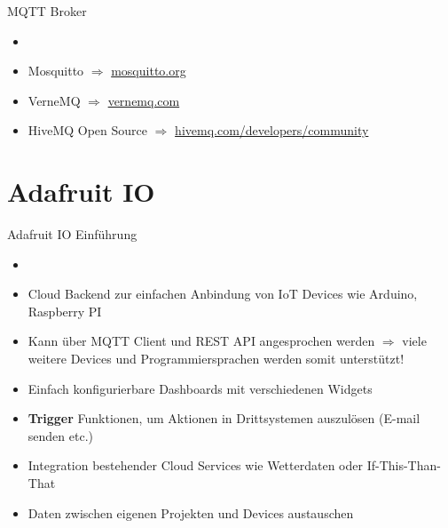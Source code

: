 \begin{frame}{MQTT Broker}
          \begin{itemize}
        \setlength{\itemindent}{1.45in}
        \item [\textbf{Broker für die Architektur}]
    \end{itemize}
    \begin{itemize}
        \item Mosquitto  $\Rightarrow$ \href{https://mosquitto.org}{mosquitto.org}
         \item VerneMQ  $\Rightarrow$ \href{https://vernemq.com}{vernemq.com}
         \item HiveMQ Open Source  $\Rightarrow$ \href{https://www.hivemq.com/developers/community}{hivemq.com/developers/community}
    \end{itemize} 
\end{frame}


\section{Adafruit IO}

\begin{frame}{Adafruit IO Einführung}
 \begin{itemize}
        \setlength{\itemindent}{1.4in}
        \item [\textbf{Adafruit IO Einführung}]
    \end{itemize}
    \begin{itemize}
        \item Cloud Backend zur einfachen Anbindung von IoT Devices wie Arduino, Raspberry PI
        \item Kann über MQTT Client und REST  API angesprochen werden  $\Rightarrow$ viele weitere Devices und Programmiersprachen werden somit unterstützt!
        \item Einfach konfigurierbare Dashboards mit verschiedenen Widgets
        \item \textbf{Trigger} Funktionen, um Aktionen in Drittsystemen auszulösen (E-mail senden etc.)
        \item Integration bestehender Cloud Services wie Wetterdaten oder If-This-Than-That
        \item Daten zwischen eigenen Projekten und Devices austauschen
    \end{itemize}    
\end{frame}


